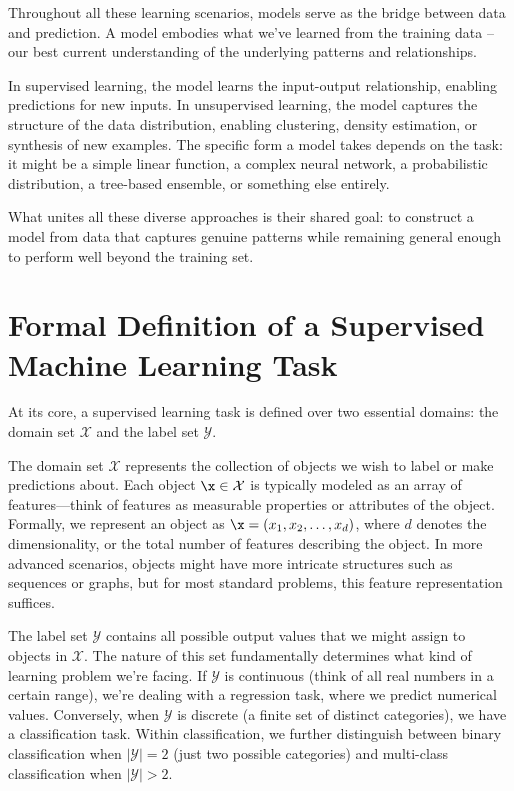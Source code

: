 
Throughout all these learning scenarios, models serve as the bridge between data and prediction. A model embodies what we've learned from the training data -- our best current understanding of the underlying patterns and relationships.

In supervised learning, the model learns the input-output relationship, enabling predictions for new inputs. In unsupervised learning, the model captures the structure of the data distribution, enabling clustering, density estimation, or synthesis of new examples. The specific form a model takes depends on the task: it might be a simple linear function, a complex neural network, a probabilistic distribution, a tree-based ensemble, or something else entirely.

What unites all these diverse approaches is their shared goal: to construct a model from data that captures genuine patterns while remaining general enough to perform well beyond the training set. 

 \section*{Formal Definition of a Supervised Machine Learning Task}

At its core, a supervised learning task is defined over two essential domains: the \alert{domain set} $\mathcal{X}$ and the \alert{label set} $\mathcal{Y}$.

The domain set $\mathcal{X}$ represents the collection of objects we wish to label or make predictions about. Each object $\x \in \mathcal{X}$ is typically modeled as an array of \alert{features}---think of features as measurable properties or attributes of the object. Formally, we represent an object as $\x = (x_1, x_2, \ldots, x_d)$, where $d$ denotes the \alert{dimensionality}, or the total number of features describing the object. In more advanced scenarios, objects might have more intricate structures such as sequences or graphs, but for most standard problems, this feature representation suffices.

The label set $\mathcal{Y}$ contains all possible output values that we might assign to objects in $\mathcal{X}$. The nature of this set fundamentally determines what kind of learning problem we're facing. If $\mathcal{Y}$ is continuous (think of all real numbers in a certain range), we're dealing with a \alert{regression} task, where we predict numerical values. Conversely, when $\mathcal{Y}$ is discrete (a finite set of distinct categories), we have a \alert{classification} task. Within classification, we further distinguish between \alert{binary classification} when $|\mathcal{Y}| = 2$ (just two possible categories) and \alert{multi-class classification} when $|\mathcal{Y}| > 2$.


